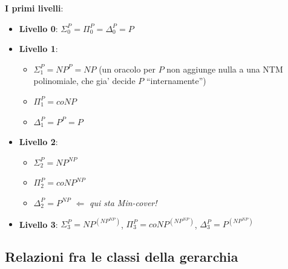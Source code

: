 \textbf{I primi livelli}:
\begin{itemize}
  \item \textbf{Livello 0}: $\Sigma_0^P = \Pi_0^P = \Delta_0^P = P$
  \item \textbf{Livello 1}:
  \begin{itemize}
    \item $\Sigma_1^P = NP^P = NP$ (un oracolo per $P$ non aggiunge nulla a una NTM polinomiale, che gia' decide $P$ ``internamente'')
    \item $\Pi_1^P = coNP$
    \item $\Delta_1^P = P^P = P$
  \end{itemize}
  \item \textbf{Livello 2}:
  \begin{itemize}
    \item $\Sigma_2^P = NP^{NP}$
    \item $\Pi_2^P = coNP^{NP}$
    \item $\Delta_2^P = P^{NP}$ \quad $\Longleftarrow$ \textit{qui sta Min-cover!}
  \end{itemize}
  \item \textbf{Livello 3}: $\Sigma_3^P = NP^{(NP^{NP})}$, $\Pi_3^P = coNP^{(NP^{NP})}$, $\Delta_3^P = P^{(NP^{NP})}$
\end{itemize}


\subsection{Relazioni fra le classi della gerarchia}

